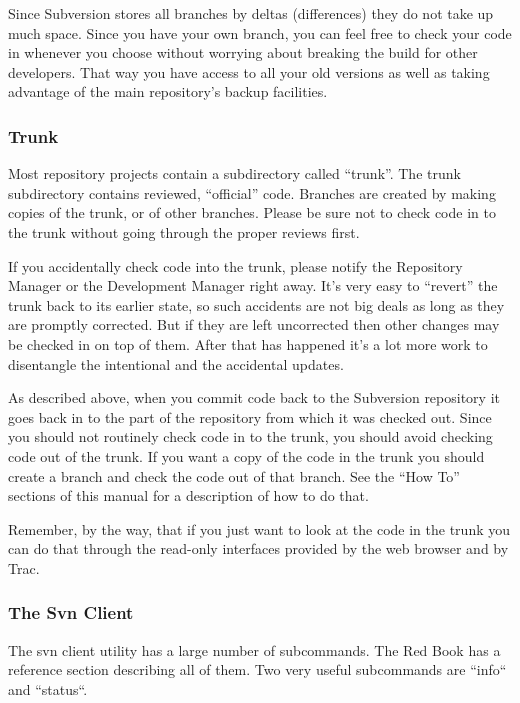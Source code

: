 Since Subversion stores all branches by deltas
(differences) they do not take up much space.  Since you
have your own branch, you can feel free to check your code
in whenever you choose without worrying about breaking
the build for other developers.  That way you have access to all your old
versions as well as taking advantage of the main
repository's backup facilities.


\subsubsection{Trunk}

Most repository projects contain a subdirectory called
``trunk''.  The trunk subdirectory contains reviewed,
``official'' code.  Branches are created by making copies
of the trunk, or of other branches.
Please be sure not to check code in to
the trunk without going through the proper reviews first.

If you accidentally check code into the trunk, please
notify the Repository Manager or the Development Manager
right away.  It's very easy to ``revert'' the trunk back to
its earlier state, so such accidents are not big deals as
long as they are promptly corrected.
But if they are left uncorrected then other changes may be
checked in on top of them.  After that has happened it's a
lot more work to disentangle the intentional and the
accidental updates.

As described above, when you commit code back to the
Subversion repository it goes back in to the part of the
repository from which it was checked out.  Since you
should not routinely check code in to the trunk, you
should avoid checking code out of the trunk.  If you want
a copy of the code in the trunk you should create a branch
and check the code out of that branch.  See the ``How To''
sections of this manual for a description of how to do
that.

Remember, by the way, that if you just want to look at the
code in the trunk you can do that through the read-only
interfaces provided by the web browser and by Trac.


\subsubsection{The Svn Client}

The svn client utility has a large number of subcommands.  The
Red Book has a reference section describing all of them.  Two
very useful subcommands are ``info`` and ``status``.

